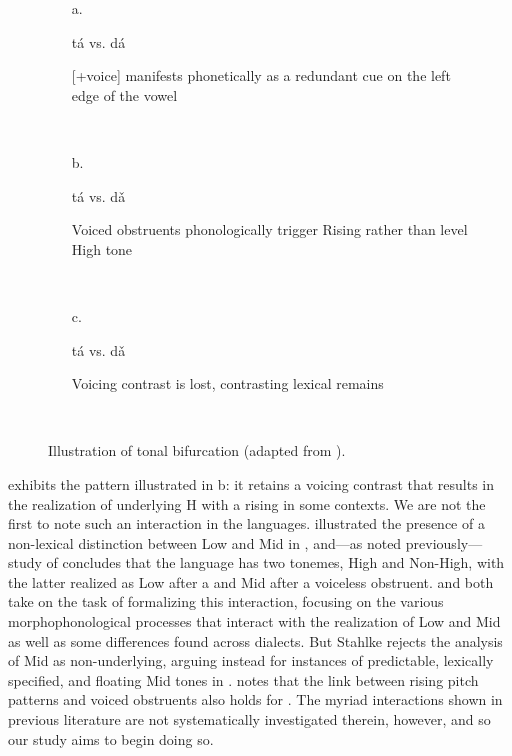 \documentclass[output=paper
,newtxmath
,modfonts
,nonflat]{langsci/langscibook}
\begin{document}
\begin{figure}

\begin{enumerate} 
\item[a.] \parbox{2cm}{tá vs. dá}\parbox[t]{9cm}{[+voice] manifests phonetically as a redundant  cue on the left edge of the vowel}\\
\item[b.] \parbox{2cm}{tá vs. dǎ}\parbox[t]{9cm}{Voiced obstruents phonologically trigger Rising rather than level High tone}\\
\item[c.] \parbox{2cm}{tá vs. dǎ}\parbox[t]{9cm}{Voicing contrast is lost, contrasting lexical  remains}\\
\end{enumerate}

\caption{\label{fig:lotven:2} Illustration of tonal bifurcation (adapted from \citealt{Hyman2013enlarging}).}
\end{figure}


 exhibits the pattern illustrated in b: it retains a voicing contrast that results in the realization of underlying H  with a rising  in some contexts. We are not the first to note such an interaction in the  languages. \citet{Westermann1928} illustrated the presence of a non-lexical distinction between Low and Mid  in , and—as noted previously— study of   concludes that the language has two tonemes, High and Non-High, with the latter realized as Low after a  and Mid after a voiceless obstruent. \citet{Smith1968} and \citet{Stahlke1971} both take on the task of formalizing this interaction, focusing on the various morphophonological processes that interact with the realization of Low and Mid  as well as some differences found across  dialects. But Stahlke rejects the analysis of Mid  as non-underlying, arguing instead for instances of predictable, lexically specified, and floating Mid tones in . \citet{Bole-Richard1983} notes that the link between rising pitch patterns and voiced obstruents also holds for . The myriad interactions shown in previous  literature are not systematically investigated therein, however, and so our study aims to begin doing so.
\end{document}

